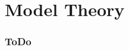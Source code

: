 \documentclass{book}
\begin{document}
	
	
	
	
	
	
	
	
	
	
	
	
	
	
	
	
	
	
	
	
	
	
	
	
	
	
	
	
	
	
	
	
	
	
	
	
	
	
	
	\newpage
	\part{Model Theory}
	
	\section{ToDo}
	
\end{document}
